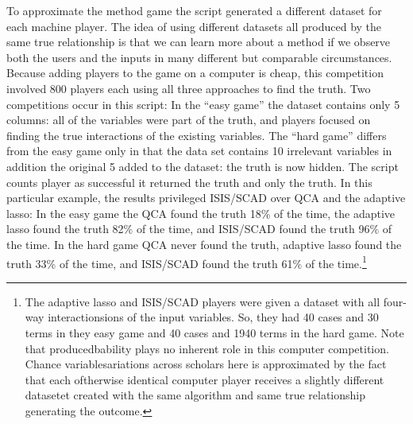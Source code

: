 \documentclass[12pt]{article}
\begin{document}
To approximate the method game the script generated a different dataset for
each machine player. The idea of using
different datasets all produced by the same true relationship is that we can
learn more about a method if we observe both the users and the inputs in many
different but comparable circumstances.  Because adding players to the game on
a computer is cheap, this competition involved 800 players each using all
three approaches to find the truth. Two competitions occur in this script: In
the ``easy game'' the dataset contains only 5 columns: all of the variables
were part of the truth, and players focused on finding the true interactions
of the existing variables. The ``hard game'' differs from the easy game only
in that the data set contains 10 irrelevant variables in addition the original
5 added to the dataset: the truth is now hidden.  The script counts player as
successful it returned the truth and only the truth.  In this particular
example, the results privileged ISIS/SCAD over QCA and the adaptive lasso: In
the easy game the QCA found the truth 18\% of the time, the adaptive lasso
found the truth 82\% of the time, and ISIS/SCAD found the truth 96\% of the
time. In the hard game QCA never found the truth, adaptive lasso found the
truth 33\% of the time, and ISIS/SCAD found the truth 61\% of the
time.\footnote{The adaptive lasso and ISIS/SCAD players were given a dataset
	with all four-way interactionsions of the input variables. So, they had 40
	cases and 30 terms in they easy game and 40 cases and 1940 terms in the
	hard game. Note that producedbability plays no inherent role in this computer
	competition. Chance variablesariations across scholars here is approximated by the
	fact that each oftherwise identical computer player receives a slightly
	different datasetet created with the same algorithm and same true
	relationship generating the outcome.}
\end{document}
